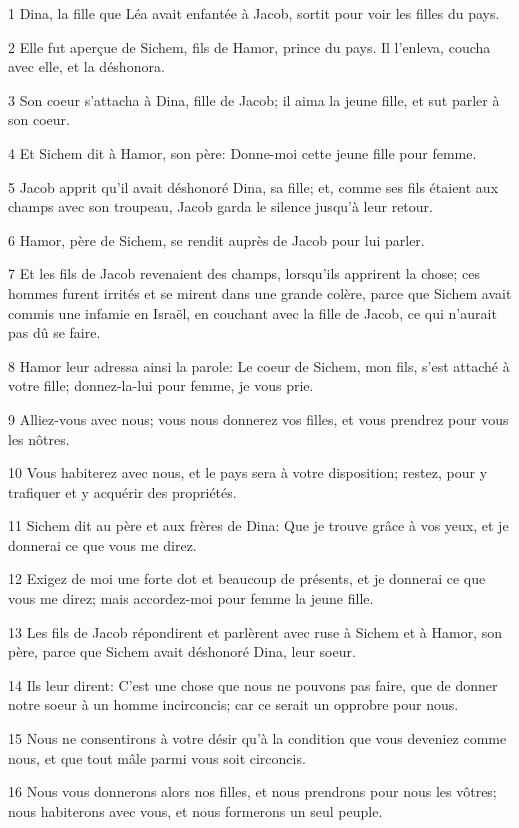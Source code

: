 \par 1 Dina, la fille que Léa avait enfantée à Jacob, sortit pour voir les filles du pays.
\par 2 Elle fut aperçue de Sichem, fils de Hamor, prince du pays. Il l'enleva, coucha avec elle, et la déshonora.
\par 3 Son coeur s'attacha à Dina, fille de Jacob; il aima la jeune fille, et sut parler à son coeur.
\par 4 Et Sichem dit à Hamor, son père: Donne-moi cette jeune fille pour femme.
\par 5 Jacob apprit qu'il avait déshonoré Dina, sa fille; et, comme ses fils étaient aux champs avec son troupeau, Jacob garda le silence jusqu'à leur retour.
\par 6 Hamor, père de Sichem, se rendit auprès de Jacob pour lui parler.
\par 7 Et les fils de Jacob revenaient des champs, lorsqu'ils apprirent la chose; ces hommes furent irrités et se mirent dans une grande colère, parce que Sichem avait commis une infamie en Israël, en couchant avec la fille de Jacob, ce qui n'aurait pas dû se faire.
\par 8 Hamor leur adressa ainsi la parole: Le coeur de Sichem, mon fils, s'est attaché à votre fille; donnez-la-lui pour femme, je vous prie.
\par 9 Alliez-vous avec nous; vous nous donnerez vos filles, et vous prendrez pour vous les nôtres.
\par 10 Vous habiterez avec nous, et le pays sera à votre disposition; restez, pour y trafiquer et y acquérir des propriétés.
\par 11 Sichem dit au père et aux frères de Dina: Que je trouve grâce à vos yeux, et je donnerai ce que vous me direz.
\par 12 Exigez de moi une forte dot et beaucoup de présents, et je donnerai ce que vous me direz; mais accordez-moi pour femme la jeune fille.
\par 13 Les fils de Jacob répondirent et parlèrent avec ruse à Sichem et à Hamor, son père, parce que Sichem avait déshonoré Dina, leur soeur.
\par 14 Ils leur dirent: C'est une chose que nous ne pouvons pas faire, que de donner notre soeur à un homme incirconcis; car ce serait un opprobre pour nous.
\par 15 Nous ne consentirons à votre désir qu'à la condition que vous deveniez comme nous, et que tout mâle parmi vous soit circoncis.
\par 16 Nous vous donnerons alors nos filles, et nous prendrons pour nous les vôtres; nous habiterons avec vous, et nous formerons un seul peuple.
